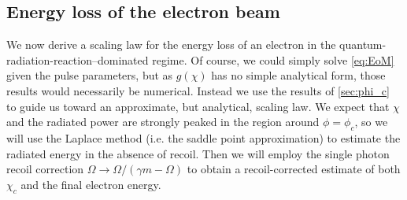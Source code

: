 \documentclass[reprint,superscriptaddress,amsmath,amssymb,aps,pra]{revtex4-1}
\begin{document}
\subsection{Energy loss of the electron beam}
\label{sec:rr}

We now derive a scaling law for the energy loss of an electron in the
quantum-radiation-reaction--dominated regime. Of course, we could
simply solve \cref{eq:EoM} given the pulse parameters, but as
$g(\chi)$ has no simple analytical form, those results would
necessarily be numerical. Instead we use the results of \cref{sec:phi_c}
to guide us toward an approximate, but analytical, scaling law.
We expect that $\chi$ and the radiated power are strongly peaked in the region
around $\phi = \phi_c$, so we will use the Laplace method (i.e. the saddle
point approximation) to estimate the radiated energy in the absence
of recoil. Then we will employ the single photon recoil correction
$\Omega \rightarrow \Omega / (\gamma m - \Omega)$ to obtain a
recoil-corrected estimate of both $\chi_c$ and the final electron
energy.
\end{document}
